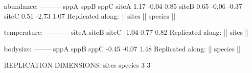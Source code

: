 \documentclass{beamer}
\numberwithin{exercise}{section}
\begin{document}
\begin{frame}[fragile]
\begin{Schunk}
\begin{Soutput}
abundance:
---------
      sppA  sppB  sppC
siteA 1.17 -0.04  0.85
siteB 0.65 -0.06 -0.37
siteC 0.51 -2.73  1.07
Replicated along:  || sites || species || 


temperature:
-----------
siteA siteB siteC 
-1.04  0.77  0.82 
Replicated along:  || sites || 
\end{Soutput}
\end{Schunk}
\begin{block}{}
\end{block}
\end{frame}

\begin{frame}[fragile]
\begin{Schunk}
\begin{Soutput}
bodysize:
--------
 sppA  sppB  sppC 
-0.45 -0.07  1.48 
Replicated along:  || species || 


REPLICATION DIMENSIONS: 
  sites species 
      3       3 
\end{Soutput}
\end{Schunk}
\end{frame}
\end{document}
